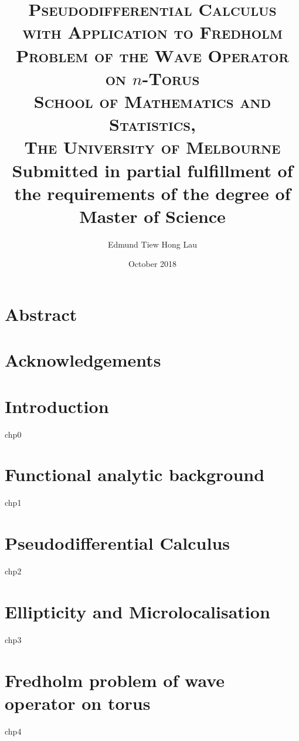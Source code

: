 \documentclass[12pt, twoside]{book}
\title{    
    \textsc{\LARGE Pseudodifferential Calculus} \\
    \textsc{\large with Application to Fredholm Problem of the Wave Operator on $n$-Torus} \\ [5em]
    \textsc{\Large School of Mathematics and Statistics, \\ The University of Melbourne} \\ [5em]
    {\large Submitted in partial fulfillment of the requirements of the degree of Master of Science} \\
}
\author{Edmund Tiew Hong Lau}
\date{October 2018}
\begin{document}
\maketitle



\chapter*{Abstract}

\chapter*{Acknowledgements}

\tableofcontents
\chapter{Introduction}
{chp0}


\chapter{Functional analytic background}
{chp1}

\chapter{Pseudodifferential Calculus}
{chp2}

\chapter{Ellipticity and Microlocalisation}
{chp3}

\chapter{Fredholm problem of wave operator on torus}
{chp4}



\end{document}
